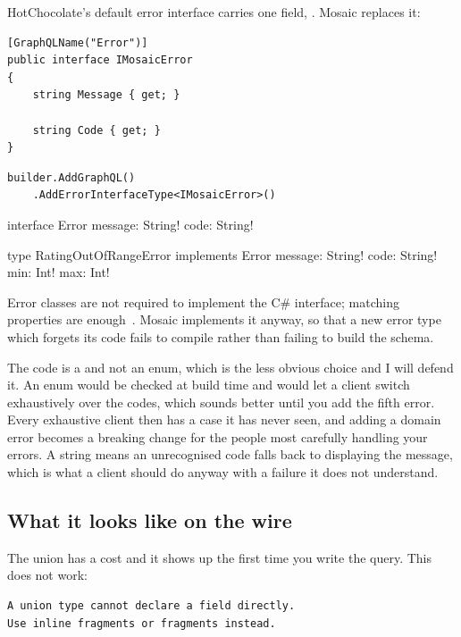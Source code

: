 %
HotChocolate's default error interface carries one field, .
Mosaic replaces it:

\begin{verbatim}
[GraphQLName("Error")]
public interface IMosaicError
{
    string Message { get; }

    string Code { get; }
}
\end{verbatim}

\begin{verbatim}
builder.AddGraphQL()
    .AddErrorInterfaceType<IMosaicError>()
\end{verbatim}

\begin{graphqlsdl}
interface Error {
  message: String!
  code: String!
}

type RatingOutOfRangeError implements Error {
  message: String!
  code: String!
  min: Int!
  max: Int!
}
\end{graphqlsdl}

Error classes are not required to implement the C\# interface; matching
properties are enough~\autocite{chillicream2026mutations}. Mosaic implements it
anyway, so that a new error type which forgets its code fails to compile rather
than failing to build the schema.

%
The code is a  and not an enum, which is the less obvious choice
and I will defend it. An enum would be checked at build time and would let a
client switch exhaustively over the codes, which sounds better until you add the
fifth error. Every exhaustive client then has a case it has never seen, and
adding a domain error becomes a breaking change for the people most carefully
handling your errors. A string means an unrecognised code falls back to
displaying the message, which is what a client should do anyway with a failure
it does not understand.

\subsection*{What it looks like on the wire}

%
The union has a cost and it shows up the first time you write the query. This
does not work:

\begin{verbatim}
A union type cannot declare a field directly.
Use inline fragments or fragments instead.
\end{verbatim}

